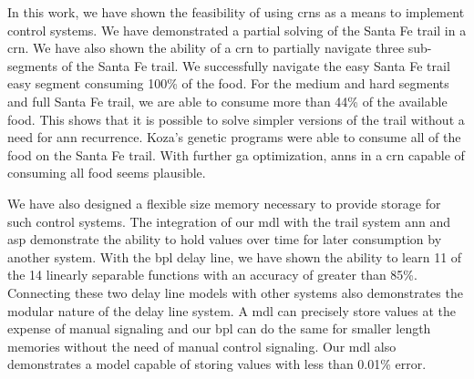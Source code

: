 In this work, we have shown the feasibility of using \glspl{crn} as a means to implement control systems. We have demonstrated a partial solving of the Santa Fe trail in a \gls{crn}. We have also shown the ability of a \gls{crn} to partially navigate three sub-segments of the Santa Fe trail. We successfully navigate the easy Santa Fe trail easy segment consuming 100\% of the food. For the medium and hard segments and full Santa Fe trail, we are able to consume more than 44\% of the available food. This shows that it is possible to solve simpler versions of the trail without a need for \gls{ann} recurrence. Koza's genetic programs were able to consume all of the food on the Santa Fe trail. With further \gls{ga} optimization, \glspl{ann} in a \gls{crn} capable of consuming all food seems plausible.

We have also designed a flexible size memory necessary to provide storage for such control systems. The integration of our \gls{mdl} with the trail system \gls{ann} and \gls{asp} demonstrate the ability to hold values over time for later consumption by another system. With the \gls{bpl} delay line, we have shown the ability to learn 11 of the 14 linearly separable functions with an accuracy of greater than 85\%. Connecting these two delay line models with other systems also demonstrates the modular nature of the delay line system. A \gls{mdl} can precisely store values at the expense of manual signaling and our \gls{bpl} can do the same for smaller length memories without the need of manual control signaling.  Our \gls{mdl} also demonstrates a model capable of storing values with less than 0.01\% error.

